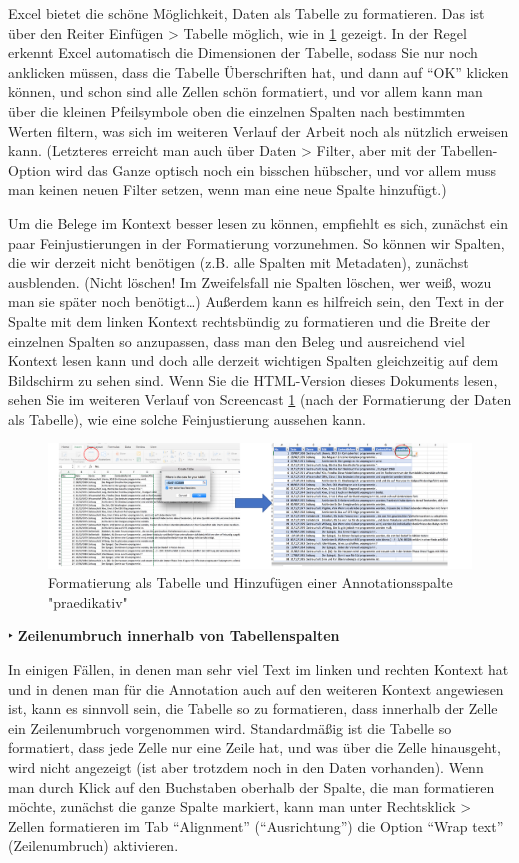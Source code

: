\documentclass[]{article}
\begin{document}
Excel bietet die schöne Möglichkeit, Daten als Tabelle zu formatieren.
Das ist über den Reiter Einfügen \textgreater{} Tabelle möglich, wie in
\ref{fig:excelastable} gezeigt. In der Regel erkennt Excel automatisch
die Dimensionen der Tabelle, sodass Sie nur noch anklicken müssen, dass
die Tabelle Überschriften hat, und dann auf ``OK'' klicken können, und
schon sind alle Zellen schön formatiert, und vor allem kann man über die
kleinen Pfeilsymbole oben die einzelnen Spalten nach bestimmten Werten
filtern, was sich im weiteren Verlauf der Arbeit noch als nützlich
erweisen kann. (Letzteres erreicht man auch über Daten \textgreater{}
Filter, aber mit der Tabellen-Option wird das Ganze optisch noch ein
bisschen hübscher, und vor allem muss man keinen neuen Filter setzen,
wenn man eine neue Spalte hinzufügt.)

Um die Belege im Kontext besser lesen zu können, empfiehlt es sich,
zunächst ein paar Feinjustierungen in der Formatierung vorzunehmen. So
können wir Spalten, die wir derzeit nicht benötigen (z.B. alle Spalten
mit Metadaten), zunächst ausblenden. (Nicht löschen! Im Zweifelsfall nie
Spalten löschen, wer weiß, wozu man sie später noch benötigt\ldots{})
Außerdem kann es hilfreich sein, den Text in der Spalte mit dem linken
Kontext rechtsbündig zu formatieren und die Breite der einzelnen Spalten
so anzupassen, dass man den Beleg und ausreichend viel Kontext lesen
kann und doch alle derzeit wichtigen Spalten gleichzeitig auf dem
Bildschirm zu sehen sind. Wenn Sie die HTML-Version dieses Dokuments
lesen, sehen Sie im weiteren Verlauf von Screencast
\ref{fig:excelastable} (nach der Formatierung der Daten als Tabelle),
wie eine solche Feinjustierung aussehen kann.

\begin{figure}
\includegraphics[width=6.66in]{docs/fig/excelastable01} \caption{Formatierung als Tabelle und Hinzufügen einer Annotationsspalte "praedikativ"}\label{fig:excelastable}
\end{figure}

 ‣ \textbf{Zeilenumbruch innerhalb von Tabellenspalten}

In einigen Fällen, in denen man sehr viel Text im linken und rechten
Kontext hat und in denen man für die Annotation auch auf den weiteren
Kontext angewiesen ist, kann es sinnvoll sein, die Tabelle so zu
formatieren, dass innerhalb der Zelle ein Zeilenumbruch vorgenommen
wird. Standardmäßig ist die Tabelle so formatiert, dass jede Zelle nur
eine Zeile hat, und was über die Zelle hinausgeht, wird nicht angezeigt
(ist aber trotzdem noch in den Daten vorhanden). Wenn man durch Klick
auf den Buchstaben oberhalb der Spalte, die man formatieren möchte,
zunächst die ganze Spalte markiert, kann man unter Rechtsklick
\textgreater{} Zellen formatieren im Tab ``Alignment'' (``Ausrichtung'')
die Option ``Wrap text'' (Zeilenumbruch) aktivieren.
\end{document}
